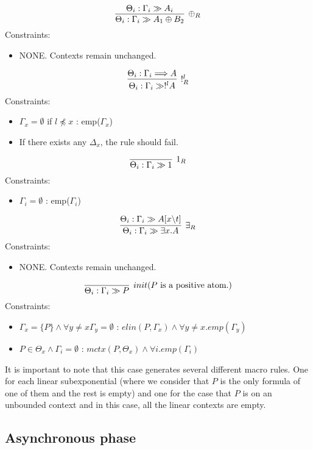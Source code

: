 \documentclass[a4paper, 11pt]{article}
\begin{document}
$$
\infer[\oplus_R]{\Theta_i : \Gamma_i \gg A_1 \oplus B_2}
{
    \Theta_i : \Gamma_i \gg A_i
}
$$
Constraints:
\begin{itemize}
    \item NONE. Contexts remain unchanged. 
\end{itemize}

$$
\infer[!^l_R]{\Theta_i : \Gamma_i \gg !^l A}
{
    \Theta_i : \Gamma_i \Longrightarrow A
}
$$
Constraints:
\begin{itemize}
    \item $\Gamma_x  = \emptyset$ if $l \npreceq x$ :  
    emp($\Gamma_x$)
    \item If there exists any $\Delta_x$, the rule should fail.
\end{itemize}

$$
\infer[1_R]{\Theta_i : \Gamma_i \gg 1}{}
$$
Constraints:
\begin{itemize}
    \item $\Gamma_i  = \emptyset$ :
    emp($\Gamma_i$)
\end{itemize}

$$
\infer[\exists_R]{\Theta_i : \Gamma_i \gg \exists x. A}
{
    \Theta_i : \Gamma_i \gg A[x \backslash t]
}
$$
Constraints:
\begin{itemize}
    \item NONE. Contexts remain unchanged.  
\end{itemize}

$$
\infer[init \text{($P$ is a positive atom.)}]{\Theta_i : \Gamma_i \gg P}{}
$$
Constraints:
\begin{itemize}
    \item $\Gamma_x = \{P\} \wedge \forall y \neq x \Gamma_y = \emptyset$ :
    $elin(P, \Gamma_x) \wedge \forall y \neq x. emp(\Gamma_y)$
    \item $P \in \Theta_x \wedge \Gamma_i = \emptyset$ : $mctx(P, \Theta_x)
    \wedge \forall i. emp(\Gamma_i)$
\end{itemize}
It is important to note that this case generates several different macro rules.
One for each linear subexponential (where we consider that $P$ is the only
formula of one of them and the rest is empty) and one for the case that $P$ is
on an unbounded context and in this case, all the linear contexts are empty.


\subsection*{Asynchronous phase}
\end{document}
